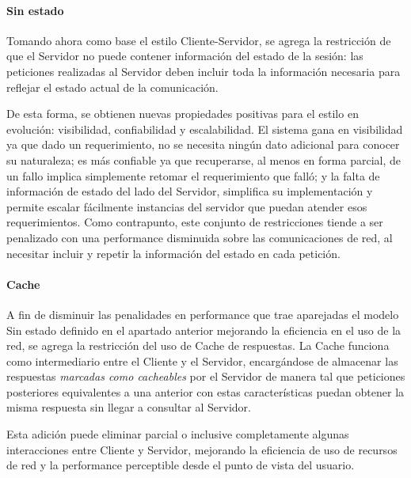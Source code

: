 \paragraph{Sin estado}

Tomando ahora como base el estilo Cliente-Servidor, se agrega la restricción de que el Servidor no puede contener información del estado de la sesión\cite[Sec.~3.4.3]{tesis:fielding}: las peticiones realizadas al Servidor deben incluir toda la información necesaria para reflejar el estado actual de la comunicación.

De esta forma, se obtienen nuevas propiedades positivas para el estilo en evolución: visibilidad, confiabilidad y escalabilidad. El sistema gana en visibilidad ya que dado un requerimiento, no se necesita ningún dato adicional para conocer su naturaleza; es más confiable ya que recuperarse, al menos en forma parcial, de un fallo implica simplemente retomar el requerimiento que falló; y la falta de información de estado del lado del Servidor, simplifica su implementación y permite escalar fácilmente instancias del servidor que puedan atender esos requerimientos. Como contrapunto, este conjunto de restricciones tiende a ser penalizado con una performance disminuida sobre las comunicaciones de red, al necesitar incluir y repetir la información del estado en cada petición.


\paragraph{Cache}

A fin de disminuir las penalidades en performance que trae aparejadas el modelo Sin estado definido en el apartado anterior mejorando la eficiencia en el uso de la red, se agrega la restricción del uso de Cache de respuestas\cite[Sec.3.4.4]{tesis:fielding}. La Cache funciona como intermediario entre el Cliente y el Servidor, encargándose de almacenar las respuestas \textit{marcadas como cacheables} por el Servidor de manera tal que peticiones posteriores equivalentes a una anterior con estas características puedan obtener la misma respuesta sin llegar a consultar al Servidor.

Esta adición puede eliminar parcial o inclusive completamente algunas interacciones entre Cliente y Servidor, mejorando la eficiencia de uso de recursos de red y la performance perceptible desde el punto de vista del usuario.

